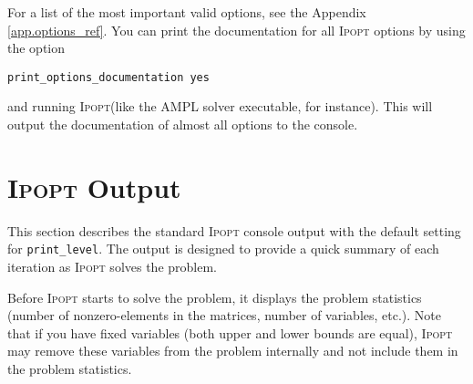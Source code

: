 \documentclass[10pt]{article}
\newcommand{\Ipopt}{\textsc{Ipopt}\xspace}
\begin{document}
For a list of the most important valid options, see the Appendix
\ref{app.options_ref}. You can print the documentation for all \Ipopt
options by using the option
\medskip

{\tt print\_options\_documentation yes}
\medskip

and running \Ipopt (like the AMPL solver executable, for
instance). This will output the documentation of almost all options to the
console.

\section{\Ipopt Output}\label{sec:output}
This section describes the standard \Ipopt console output with the
default setting for {\tt print\_level}. The output is designed to
provide a quick summary of each iteration as \Ipopt solves the problem.

Before \Ipopt starts to solve the problem, it displays the problem
statistics (number of nonzero-elements in the matrices, number of
variables, etc.). Note that if you have fixed variables (both upper
and lower bounds are equal), \Ipopt may remove these variables from
the problem internally and not include them in the problem statistics.
\end{document}
